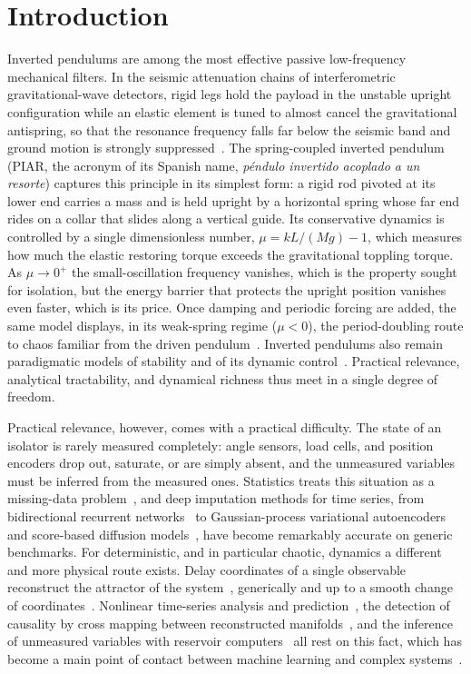 \section{Introduction}\label{sec:intro}

Inverted pendulums are among the most effective passive low-frequency mechanical filters. In the seismic attenuation chains of interferometric gravitational-wave detectors, rigid legs hold the payload in the unstable upright configuration while an elastic element is tuned to almost cancel the gravitational antispring, so that the resonance frequency falls far below the seismic band and ground motion is strongly suppressed~\cite{Losurdo1999,Takamori2007}. The spring-coupled inverted pendulum (PIAR, the acronym of its Spanish name, \textit{p\'endulo invertido acoplado a un resorte}) captures this principle in its simplest form: a rigid rod pivoted at its lower end carries a mass and is held upright by a horizontal spring whose far end rides on a collar that slides along a vertical guide. Its conservative dynamics is controlled by a single dimensionless number, $\mu=kL/(Mg)-1$, which measures how much the elastic restoring torque exceeds the gravitational toppling torque. As $\mu\to0^{+}$ the small-oscillation frequency vanishes, which is the property sought for isolation, but the energy barrier that protects the upright position vanishes even faster, which is its price. Once damping and periodic forcing are added, the same model displays, in its weak-spring regime ($\mu<0$), the period-doubling route to chaos familiar from the driven pendulum~\cite{BakerGollub1996,Strogatz2015,GuckenheimerHolmes1983}. Inverted pendulums also remain paradigmatic models of stability and of its dynamic control~\cite{Butikov2001}. Practical relevance, analytical tractability, and dynamical richness thus meet in a single degree of freedom.

Practical relevance, however, comes with a practical difficulty. The state of an isolator is rarely measured completely: angle sensors, load cells, and position encoders drop out, saturate, or are simply absent, and the unmeasured variables must be inferred from the measured ones. Statistics treats this situation as a missing-data problem~\cite{LittleRubin2019}, and deep imputation methods for time series, from bidirectional recurrent networks~\cite{Cao2018} to Gaussian-process variational autoencoders~\cite{Fortuin2020} and score-based diffusion models~\cite{Tashiro2021}, have become remarkably accurate on generic benchmarks. For deterministic, and in particular chaotic, dynamics a different and more physical route exists. Delay coordinates of a single observable reconstruct the attractor of the system~\cite{Packard1980,Takens1981}, generically and up to a smooth change of coordinates~\cite{Sauer1991}. Nonlinear time-series analysis and prediction~\cite{Abarbanel1993,KantzSchreiber2004,Casdagli1989,Pathak2018}, the detection of causality by cross mapping between reconstructed manifolds~\cite{Sugihara2012}, and the inference of unmeasured variables with reservoir computers~\cite{Lu2017} all rest on this fact, which has become a main point of contact between machine learning and complex systems~\cite{Tang2020}.

